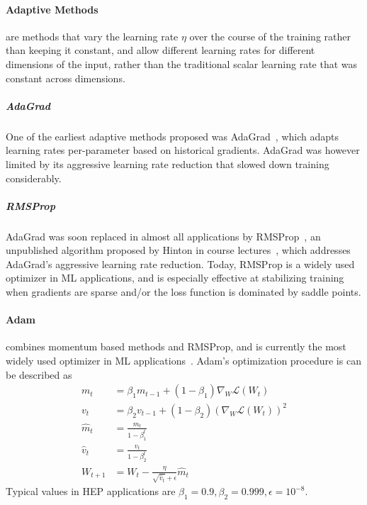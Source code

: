             \paragraph{Adaptive Methods}are methods that vary the learning rate \(\eta\) over the course of the training rather than keeping it constant, and allow different learning rates for different dimensions of the input, rather than the traditional scalar learning rate that was constant across dimensions.
                \subparagraph{AdaGrad}
                    One of the earliest adaptive methods proposed was AdaGrad~\cite{duchi_adaptive_nodate}, which adapts learning rates per-parameter based on historical gradients.
                    AdaGrad was however limited by its aggressive learning rate reduction that slowed down training considerably.
                \subparagraph{RMSProp}
                    AdaGrad was soon replaced in almost all applications by RMSProp~\cite{hinton_neural_nodate}, an unpublished algorithm proposed by Hinton in course lectures~\cite{ruder_overview_2017}, which addresses AdaGrad's aggressive learning rate reduction.
                    Today, RMSProp is a widely used optimizer in ML applications, and is especially effective at stabilizing training when gradients are sparse and/or the loss function is dominated by saddle points.
            
            \paragraph{Adam}combines momentum based methods and RMSProp, and is currently the most widely used optimizer in ML applications~\cite{kingma_adam_2017}.
                Adam's optimization procedure is can be described as
                 \begin{align}
                     m_t &= \beta_1 m_{t-1} + (1 - \beta_1) \nabla_W \mathcal{L}(W_t) \\
                     v_t &= \beta_2 v_{t-1} + (1 - \beta_2) (\nabla_W\mathcal{L}(W_t))^2 \\
                     \hat{m}_t &= \frac{m_t}{1 - \beta_1^t} \\
                     \hat{v}_t &= \frac{v_t}{1 - \beta_2^t} \\
                     W_{t+1} &= W_t - \frac{\eta}{\sqrt{\hat{v}_t} + \epsilon} \hat{m}_t
                 \end{align}
                Typical values in HEP applications are \(\beta_1 = 0.9, \beta_2 = 0.999, \epsilon = 10^{-8}\).
            
